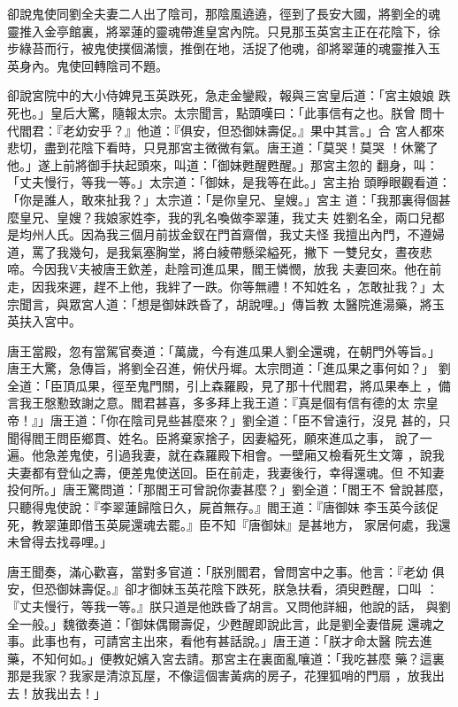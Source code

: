 \begin{pinyinscope}
{卻說鬼使同劉全夫妻二人出了陰司，那陰風遶遶，徑到了長安大國，將劉全的魂
靈推入金亭館裏，將翠蓮的靈魂帶進皇宮內院。只見那玉英宮主正在花陰下，徐
步綠苔而行，被鬼使撲個滿懷，推倒在地，活捉了他魂，卻將翠蓮的魂靈推入玉
英身內。鬼使回轉陰司不題。

卻說宮院中的大小侍婢見玉英跌死，急走金鑾殿，報與三宮皇后道：「宮主娘娘
跌死也。」皇后大驚，隨報太宗。太宗聞言，點頭嘆曰：「此事信有之也。朕曾
問十代閻君：『老幼安乎？』他道：『俱安，但恐御妹壽促。』果中其言。」合
宮人都來悲切，盡到花陰下看時，只見那宮主微微有氣。唐王道：「莫哭！莫哭
！休驚了他。」遂上前將御手扶起頭來，叫道：「御妹甦醒甦醒。」那宮主忽的
翻身，叫：「丈夫慢行，等我一等。」太宗道：「御妹，是我等在此。」宮主抬
頭睜眼觀看道：「你是誰人，敢來扯我？」太宗道：「是你皇兄、皇嫂。」宮主
道：「我那裏得個甚麼皇兄、皇嫂？我娘家姓李，我的乳名喚做李翠蓮，我丈夫
姓劉名全，兩口兒都是均州人氏。因為我三個月前拔金釵在門首齋僧，我丈夫怪
我擅出內門，不遵婦道，罵了我幾句，是我氣塞胸堂，將白綾帶懸梁縊死，撇下
一雙兒女，晝夜悲啼。今因我V夫被唐王欽差，赴陰司進瓜果，閻王憐憫，放我
夫妻回來。他在前走，因我來遲，趕不上他，我絆了一跌。你等無禮！不知姓名
，怎敢扯我？」太宗聞言，與眾宮人道：「想是御妹跌昏了，胡說哩。」傳旨教
太醫院進湯藥，將玉英扶入宮中。

唐王當殿，忽有當駕官奏道：「萬歲，今有進瓜果人劉全還魂，在朝門外等旨。」
唐王大驚，急傳旨，將劉全召進，俯伏丹墀。太宗問道：「進瓜果之事何如？」
劉全道：「臣頂瓜果，徑至鬼門關，引上森羅殿，見了那十代閻君，將瓜果奉上
，備言我王慇懃致謝之意。閻君甚喜，多多拜上我王道：『真是個有信有德的太
宗皇帝！』」唐王道：「你在陰司見些甚麼來？」劉全道：「臣不曾遠行，沒見
甚的，只聞得閻王問臣鄉貫、姓名。臣將棄家捨子，因妻縊死，願來進瓜之事，
說了一遍。他急差鬼使，引過我妻，就在森羅殿下相會。一壁廂又檢看死生文簿
，說我夫妻都有登仙之壽，便差鬼使送回。臣在前走，我妻後行，幸得還魂。但
不知妻投何所。」唐王驚問道：「那閻王可曾說你妻甚麼？」劉全道：「閻王不
曾說甚麼，只聽得鬼使說：『李翠蓮歸陰日久，屍首無存。』閻王道：『唐御妹
李玉英今該促死，教翠蓮即借玉英屍還魂去罷。』臣不知『唐御妹』是甚地方，
家居何處，我還未曾得去找尋哩。」

唐王聞奏，滿心歡喜，當對多官道：「朕別閻君，曾問宮中之事。他言：『老幼
俱安，但恐御妹壽促。』卻才御妹玉英花陰下跌死，朕急扶看，須臾甦醒，口叫
：『丈夫慢行，等我一等。』朕只道是他跌昏了胡言。又問他詳細，他說的話，
與劉全一般。」魏徵奏道：「御妹偶爾壽促，少甦醒即說此言，此是劉全妻借屍
還魂之事。此事也有，可請宮主出來，看他有甚話說。」唐王道：「朕才命太醫
院去進藥，不知何如。」便教妃嬪入宮去請。那宮主在裏面亂嚷道：「我吃甚麼
藥？這裏那是我家？我家是清涼瓦屋，不像這個害黃病的房子，花狸狐哨的門扇
，放我出去！放我出去！」

}
\end{pinyinscope}
